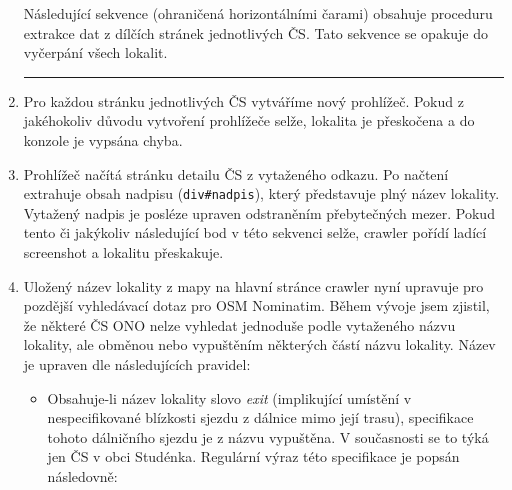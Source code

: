 \begin{enumerate}
        Následující sekvence (ohraničená horizontálními čarami) obsahuje proceduru
        extrakce dat z dílčích stránek jednotlivých ČS. Tato sekvence se opakuje
        do vyčerpání všech lokalit.
        \hrule
    \item Pro každou stránku jednotlivých ČS vytváříme nový prohlížeč. Pokud z jakéhokoliv
        důvodu vytvoření prohlížeče selže, lokalita je přeskočena a do konzole je vypsána
        chyba.
    \item Prohlížeč načítá stránku detailu ČS z vytaženého odkazu. Po načtení extrahuje
        obsah nadpisu (\texttt{div\#nadpis}), který představuje plný název lokality.
        Vytažený nadpis je posléze upraven odstraněním přebytečných mezer. Pokud tento
        či jakýkoliv následující bod v této sekvenci selže, crawler pořídí ladící
        screenshot a lokalitu přeskakuje.
    \item Uložený název lokality z mapy na hlavní stránce crawler nyní upravuje pro pozdější
        vyhledávací dotaz pro OSM Nominatim. Během vývoje jsem zjistil, že některé ČS ONO
        nelze vyhledat jednoduše podle vytaženého názvu lokality, ale obměnou
        nebo vypuštěním některých částí názvu lokality. Název je upraven dle následujících
        pravidel:
        \begin{itemize}
            \item Obsahuje-li název lokality slovo \emph{exit} (implikující umístění
                v nespecifikované blízkosti sjezdu z dálnice mimo její trasu), specifikace
                tohoto dálničního sjezdu je z názvu vypuštěna. V současnosti se to týká jen
                ČS v obci Studénka. Regulární výraz této specifikace je popsán následovně:
                

\end{itemize}
\end{enumerate}
